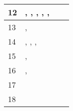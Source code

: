 \begin{table}[]
\begin{tabular}{|l|l|l|l|}
        12                 & \cite{Dornenburg.2019}, \cite{Grijzen.2019}, \cite{Laug.2018}, \cite{Vogel.2020.Olleck}, \cite{Vogel.2020.Rehm}, \cite{Vogel.2020.Steyer}                      &                                                                                                              &                                                                               \\ \hline
        13                 & \cite{Dornenburg.2019}, \cite{Vogel.2020.Huber}                                                                                                                & \cite{Vogel.2020.Rehm}                                                                                       &                                                                               \\ \hline
        14                 & \cite{Grijzen.2019}, \cite{Laug.2018}, \cite{Vogel.2020.Mezzalira}, \cite{Vogel.2020.Olleck}                                                                   &                                                                                                              &                                                                               \\ \hline
        15                 & \cite{Dornenburg.2019}, \cite{Vogel.2020.Mezzalira}                                                                                                            &                                                                                                              &                                                                               \\ \hline
        16                 & \cite{Grijzen.2019}, \cite{Vogel.2020.Rehm}                                                                                                                    &                                                                                                              &                                                                               \\ \hline
        17                 & \cite{Vogel.2020.Mezzalira}                                                                                                                                    &                                                                                                              &                                                                               \\ \hline
        18                 & \cite{Grijzen.2019}                                                                                                                                            &                                                                                                              &                                                                               \\ \hline

\end{tabular}
\end{table}

